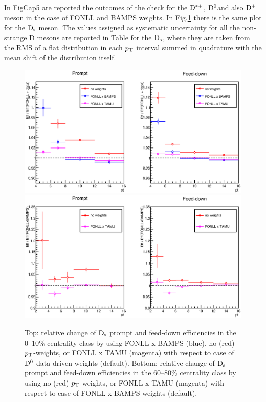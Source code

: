 In FigCap5 
are reported the outcomes of the check for the ${\rm D^{*+}}$, ${\rm D^0}$and also ${\rm D^+}$ meson 
in the case of FONLL and BAMPS weights. 
In Fig.\ref{DsMCshape_010_6080} there is the same plot for the ${\rm D_s}$ meson.
The values assigned as systematic uncertainty for all the non-strange D mesons are reported in 
Table  for the ${\rm D_s}$, where they are taken from the RMS
of a flat distribution in each $p_{\rm T}$ interval summed in quadrature with the mean shift of the distribution itself. 



\begin{figure}[!htp]
\begin{center}
\includegraphics[angle=0, width=11.cm]{./FigCap5/MCptweights010_overFONLLdata_617.eps}   
\includegraphics[angle=0, width=11.cm]{./FigCap5/MCptweights6080_overFONLLBAMPS_618.eps}   
\end{center}
\caption{Top: relative change of $\rm {\rm D_s}$ prompt and feed-down efficiencies in the 0--10\% centrality class by using FONLL  x BAMPS (blue), no (red) $p_{\rm T}$-weights, or FONLL x TAMU (magenta) with respect to case of ${\rm D^0}$ data-driven weights (default). Bottom: relative change of $\rm {\rm D_s}$ prompt and feed-down efficiencies in the 60--80\% centrality class by using no (red) $p_{\rm T}$-weights, or FONLL x TAMU (magenta) with respect to case of FONLL x BAMPS weights (default).}
\label{DsMCshape_010_6080} 
\end{figure}

